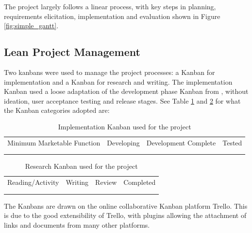 The project largely follows a linear process, with key steps in planning, requirements elicitation, 
implementation and evaluation shown in Figure \ref{fig:simple_gantt}.

\subsection{Lean Project Management}

Two kanbans were used to manage the project processes: a Kanban for implementation and 
a Kanban for research and writing. The implementation Kanban used
a loose adaptation of the development phase Kanban from \citet[p.25]{middleton2012lean}, 
without ideation, user acceptance testing and release stages.
See Table \ref{table:kanban-implementation} and \ref{table:kanban-research} for what the Kanban categories adopted are:
\\
\begin{table}[!ht] 
    \caption{Implementation Kanban used for the project}
    \centering
    \label{table:kanban-implementation}
    \begin{tabular}{|c|c|c|c|}
        \hline
        Minimum Marketable Function & Developing & Development Complete & Tested \\
        &&&\\
        &&&\\
        \hline
    \end{tabular}
\end{table}
\begin{table}[!ht] 
    \caption{Research Kanban used for the project}
    \centering
    \label{table:kanban-research}
    \begin{tabular}{|c|c|c|c|}
        \hline
        Reading/Activity & Writing & Review & Completed\\
        &&&\\
        &&&\\        
        \hline
    \end{tabular}
\end{table}

The Kanbans are drawn on the online collaborative Kanban platform Trello. This is due to 
the good extensibility of Trello, with plugins allowing the attachment of links and documents 
from many other platforms.


